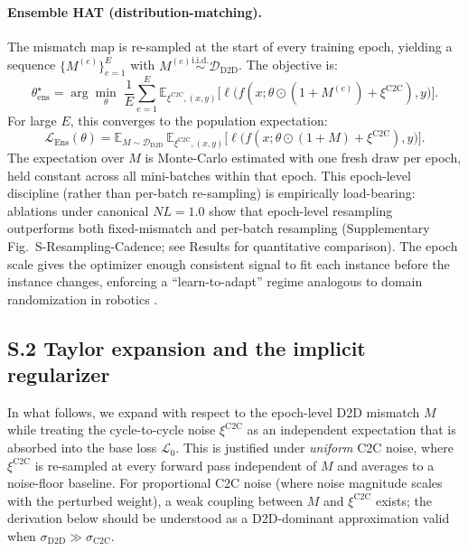\paragraph{Ensemble HAT (distribution-matching).} The mismatch map is re-sampled at the start of every training epoch, yielding a sequence $\{M^{(e)}\}_{e=1}^{E}$ with $M^{(e)} \stackrel{\text{i.i.d.}}{\sim} \mathcal{D}_{\text{D2D}}$. The objective is:
\begin{equation}
    \theta_{\text{ens}}^{\star} = \arg\min_{\theta} \; \frac{1}{E}\sum_{e=1}^{E} \mathbb{E}_{\xi^{\text{C2C}}, (x,y)} \bigl[ \ell\bigl(f(x; \theta \odot (1+M^{(e)}) + \xi^{\text{C2C}}), y\bigr) \bigr].
    \label{eq:ensemble-hat-objective}
\end{equation}
For large $E$, this converges to the population expectation:
\begin{equation}
    \mathcal{L}_{\text{Ens}}(\theta) = \mathbb{E}_{M \sim \mathcal{D}_{\text{D2D}}} \, \mathbb{E}_{\xi^{\text{C2C}}, (x,y)} \bigl[ \ell\bigl(f(x; \theta \odot (1+M) + \xi^{\text{C2C}}), y\bigr) \bigr].
    \label{eq:ensemble-population}
\end{equation}
The expectation over $M$ is Monte-Carlo estimated with one fresh draw per epoch, held constant across all mini-batches within that epoch. This epoch-level discipline (rather than per-batch re-sampling) is empirically load-bearing: ablations under canonical $NL=1.0$ show that epoch-level resampling outperforms both fixed-mismatch and per-batch resampling (Supplementary Fig.~S-Resampling-Cadence; see Results for quantitative comparison). The epoch scale gives the optimizer enough consistent signal to fit each instance before the instance changes, enforcing a ``learn-to-adapt'' regime analogous to domain randomization in robotics \citep{tobin2017domain}.

\subsection*{S.2 Taylor expansion and the implicit regularizer}

In what follows, we expand with respect to the epoch-level D2D mismatch $M$ while treating the cycle-to-cycle noise $\xi^{\text{C2C}}$ as an independent expectation that is absorbed into the base loss $\mathcal{L}_0$. This is justified under \emph{uniform} C2C noise, where $\xi^{\text{C2C}}$ is re-sampled at every forward pass independent of $M$ and averages to a noise-floor baseline. For proportional C2C noise (where noise magnitude scales with the perturbed weight), a weak coupling between $M$ and $\xi^{\text{C2C}}$ exists; the derivation below should be understood as a D2D-dominant approximation valid when $\sigma_{\text{D2D}} \gg \sigma_{\text{C2C}}$.

